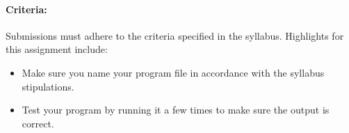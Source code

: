 \documentclass[11pt]{article}
\begin{document}
    \paragraph{Criteria:} Submissions must adhere to the criteria
    specified in the syllabus.  Highlights for this assignment include:

        \begin{itemize}
                
            \item Make sure you name your program file in accordance
                with the syllabus stipulations.

            \item Test your program by running it a few times to make
                sure the output is correct.

        \end{itemize}
\end{document}
